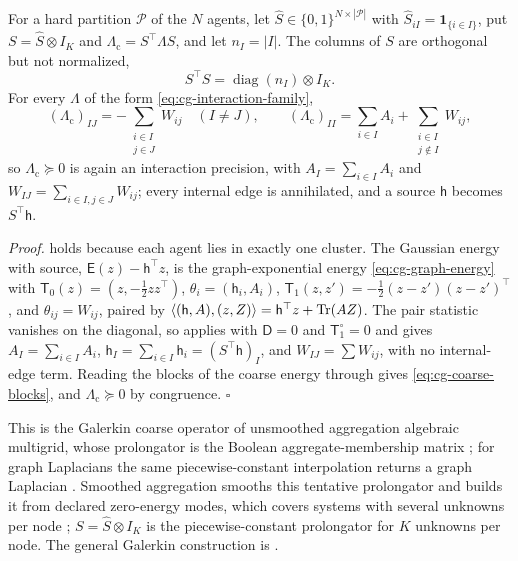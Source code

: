 For a hard partition \(\mathcal P\) of the \(N\) agents, let
\(\widehat S\in\{0,1\}^{N\times|\mathcal P|}\) with
\(\widehat S_{iI}=\mathbf 1_{\{i\in I\}}\), put
\(S=\widehat S\otimes I_K\) and \(\Lambda_{\mathrm c}=S^\top\Lambda S\), and let
\(n_I=|I|\). The columns of \(S\) are orthogonal but not normalized,
\begin{equation}
S^\top S=\operatorname{diag}(n_I)\otimes I_K .
\label{eq:cg-aggregation-matrix}
\end{equation}
For every \(\Lambda\) of the form \eqref{eq:cg-interaction-family},
\begin{equation}
(\Lambda_{\mathrm c})_{IJ}
=-\sum_{\substack{i\in I\\j\in J}}W_{ij}\quad(I\neq J),
\qquad
(\Lambda_{\mathrm c})_{II}
=\sum_{i\in I}A_i
+\sum_{\substack{i\in I\\j\notin I}}W_{ij},
\label{eq:cg-coarse-blocks}
\end{equation}
so \(\Lambda_{\mathrm c}\succeq0\) is again an interaction precision, with
\(A_I=\sum_{i\in I}A_i\) and \(W_{IJ}=\sum_{i\in I,j\in J}W_{ij}\); every
internal edge is annihilated, and a source \(\mathsf h\) becomes
\(S^\top\mathsf h\). 

\noindent\emph{Proof.}
 holds because each agent lies in exactly one
cluster. The Gaussian energy with source,
\(\mathsf E(z)-\mathsf h^\top z\), is the graph-exponential energy
\eqref{eq:cg-graph-energy} with \(\mathsf T_0(z)=(z,-\tfrac12zz^\top)\),
\(\theta_i=(\mathsf h_i,A_i)\), \(\mathsf T_1(z,z')=-\tfrac12(z-z')(z-z')^\top\), and
\(\theta_{ij}=W_{ij}\), paired by \(\langle(\mathsf h,A),(z,Z)\rangle
=\mathsf h^\top z+\operatorname{Tr}(AZ)\). The pair statistic vanishes on the diagonal, so
 applies with \(\mathsf D=0\) and
\(\mathsf T_1^\circ=0\) and gives \(A_I=\sum_{i\in I}A_i\),
\(\mathsf h_I=\sum_{i\in I}\mathsf h_i=(S^\top\mathsf h)_I\), and
\(W_{IJ}=\sum W_{ij}\), with no internal-edge term. Reading the blocks of the
coarse energy through  gives
\eqref{eq:cg-coarse-blocks}, and \(\Lambda_{\mathrm c}\succeq0\) by
congruence. \(\square\)

This is the Galerkin coarse operator of unsmoothed aggregation algebraic
multigrid, whose prolongator is the Boolean aggregate-membership matrix
\citep[Eqs.~(2.1)--(2.2)]{Notay2010Aggregation}; for graph Laplacians the same
piecewise-constant interpolation returns a graph Laplacian
\citep[Sec.~2]{LivneBrandt2012LAMG}. Smoothed aggregation smooths this
tentative prolongator and builds it from declared zero-energy modes, which
covers systems with several unknowns per node \citep{VanekMandelBrezina1996};
\(S=\widehat S\otimes I_K\) is the piecewise-constant prolongator for \(K\)
unknowns per node. The general Galerkin construction is
.

